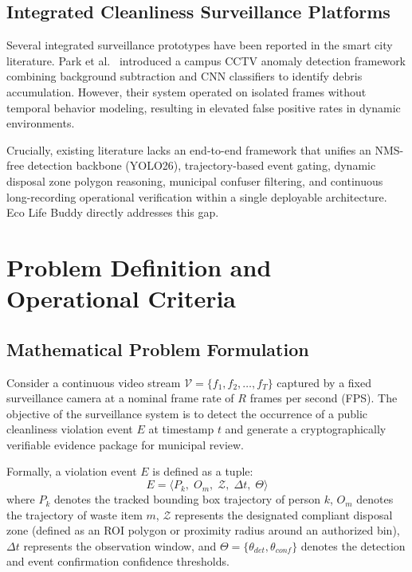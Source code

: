 \documentclass[conference]{IEEEtran}
\begin{document}
\subsection{Integrated Cleanliness Surveillance Platforms}

Several integrated surveillance prototypes have been reported in the smart city literature. Park et al.\ \cite{b20} introduced a campus CCTV anomaly detection framework combining background subtraction and CNN classifiers to identify debris accumulation. However, their system operated on isolated frames without temporal behavior modeling, resulting in elevated false positive rates in dynamic environments. 

Crucially, existing literature lacks an end-to-end framework that unifies an NMS-free detection backbone (YOLO26), trajectory-based event gating, dynamic disposal zone polygon reasoning, municipal confuser filtering, and continuous long-recording operational verification within a single deployable architecture. Eco Life Buddy directly addresses this gap.

\section{Problem Definition and Operational Criteria}
\label{sec:problem}

\subsection{Mathematical Problem Formulation}

Consider a continuous video stream $\mathcal{V} = \{f_1, f_2, \ldots, f_T\}$ captured by a fixed surveillance camera at a nominal frame rate of $R$ frames per second (FPS). The objective of the surveillance system is to detect the occurrence of a public cleanliness violation event $E$ at timestamp $t$ and generate a cryptographically verifiable evidence package for municipal review.

Formally, a violation event $E$ is defined as a tuple:
\begin{equation}
E = \langle P_k,\; O_m,\; \mathcal{Z},\; \Delta t,\; \Theta \rangle
\end{equation}
where $P_k$ denotes the tracked bounding box trajectory of person $k$, $O_m$ denotes the trajectory of waste item $m$, $\mathcal{Z}$ represents the designated compliant disposal zone (defined as an ROI polygon or proximity radius around an authorized bin), $\Delta t$ represents the observation window, and $\Theta = \{\theta_{det}, \theta_{conf}\}$ denotes the detection and event confirmation confidence thresholds.
\end{document}
